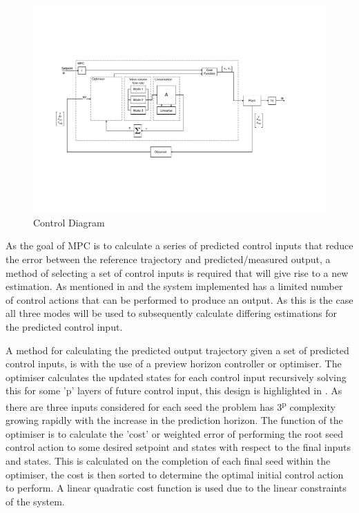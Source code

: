 \documentclass[11pt,a4paper]{article}
\begin{document}
\begin{figure}[!hbt]
    \centering
    \includegraphics[clip, trim=2cm 4cm 4cm 4cm, width=1.00\textwidth]{BlockDiagram_Overview.pdf}
    \caption{Control Diagram}
    \label{fig:control_diagram_overview}
\end{figure}

As the goal of MPC is to calculate a series of predicted control inputs that reduce the error between the reference trajectory and predicted/measured output, a method of selecting a set of control inputs is required that will give rise to a new estimation. As mentioned in  and  the system implemented has a limited number of control actions that can be performed to produce an output. As this is the case all three modes will be used to subsequently calculate differing estimations for the predicted control input. \newline

A method for calculating the predicted output trajectory given a set of predicted control inputs, is with the use of a preview horizon controller or optimiser. The optimiser calculates the updated states for each control input recursively solving this for some 'p' layers of future control input, this design is highlighted in . As there are three inputs considered for each seed the problem has 3\textsuperscript{p} complexity growing rapidly with the increase in the prediction horizon. The function of the optimiser is to calculate the 'cost'  or weighted error of performing the root seed control action to some desired setpoint and states with respect to the final inputs and states. This is calculated on the completion of each final seed within the optimiser, the cost is then sorted to determine the optimal initial control action to perform. A linear quadratic cost function is used due to the linear constraints of the system.
\end{document}
